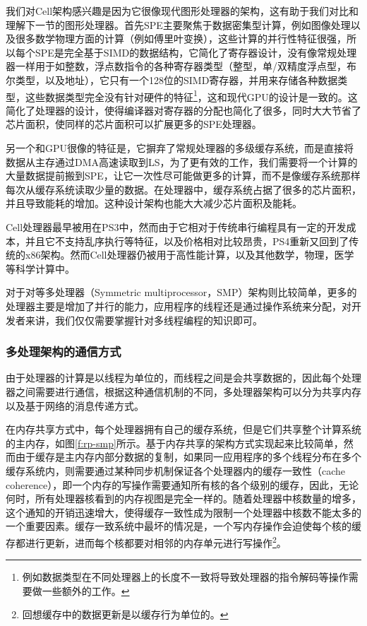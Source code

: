 我们对Cell架构感兴趣是因为它很像现代图形处理器的架构，这有助于我们对比和理解下一节的图形处理器。首先SPE主要聚焦于数据密集型计算，例如图像处理以及很多数学物理方面的计算（例如傅里叶变换），这些计算的并行性特征很强，所以每个SPE是完全基于SIMD的数据结构，它简化了寄存器设计，没有像常规处理器一样用于如整数，浮点数指令的各种寄存器类型（整型，单/双精度浮点型，布尔类型，以及地址），它只有一个128位的SIMD寄存器，并用来存储各种数据类型，这些数据类型完全没有针对硬件的特征\footnote{例如数据类型在不同处理器上的长度不一致将导致处理器的指令解码等操作需要做一些额外的工作。}，这和现代GPU的设计是一致的。这简化了处理器的设计，使得编译器对寄存器的分配也简化了很多，同时大大节省了芯片面积，使同样的芯片面积可以扩展更多的SPE处理器。

另一个和GPU很像的特征是，它摒弃了常规处理器的多级缓存系统，而是直接将数据从主存通过DMA高速读取到LS，为了更有效的工作，我们需要将一个计算的大量数据提前搬到SPE，让它一次性尽可能做更多的计算，而不是像缓存系统那样每次从缓存系统读取少量的数据。在处理器中，缓存系统占据了很多的芯片面积，并且导致能耗的增加。这种设计架构也能大大减少芯片面积及能耗。

Cell处理器最早被用在PS3中\cite{a:PlayStation3SystemArchitecture}，然而由于它相对于传统串行编程具有一定的开发成本，并且它不支持乱序执行等特征，以及价格相对比较昂贵，PS4重新又回到了传统的x86架构。然而Cell处理器仍被用于高性能计算，以及其他数学，物理，医学等科学计算中。

对于对等多处理器（Symmetric multiprocessor，SMP）架构则比较简单，更多的处理器主要是增加了并行的能力，应用程序的线程还是通过操作系统来分配，对开发者来讲，我们仅仅需要掌握针对多线程编程的知识即可。




\subsubsection{多处理架构的通信方式}
由于处理器的计算是以线程为单位的，而线程之间是会共享数据的，因此每个处理器之间需要进行通信，根据这种通信机制的不同，多处理器架构可以分为共享内存以及基于网络的消息传递方式。

在内存共享方式中，每个处理器拥有自己的缓存系统，但是它们共享整个计算系统的主内存，如图\ref{f:rp-smp}所示。基于内存共享的架构方式实现起来比较简单，然而由于缓存是主内存内部分数据的复制，如果同一应用程序的多个线程分布在多个缓存系统内，则需要通过某种同步机制保证各个处理器内的缓存一致性（cache coherence），即一个内存的写操作需要通知所有核的各个级别的缓存，因此，无论何时，所有处理器核看到的内存视图是完全一样的。随着处理器中核数量的增多，这个通知的开销迅速增大，使得缓存一致性成为限制一个处理器中核数不能太多的一个重要因素。缓存一致系统中最坏的情况是，一个写内存操作会迫使每个核的缓存都进行更新，进而每个核都要对相邻的内存单元进行写操作\footnote{回想缓存中的数据更新是以缓存行为单位的。}。

